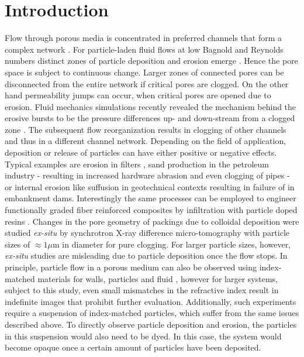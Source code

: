 \documentclass[smallextended]{svjour3}       %
\begin{document}
\section{Introduction}\label{intro}
Flow through porous media is concentrated in preferred channels that form a complex network \cite{Morais-etal-2009,Ebrahimi-etal-2014}. For particle-laden fluid flows at low Bagnold and Reynolds numbers distinct zones of particle deposition and erosion emerge \cite{herrmann-andrade_araujo-2007,araujo-andrade-2006,herrmann-andrade_etal-2006}. Hence the pore space is subject to continuous change. Larger zones of connected pores can be disconnected from the entire network if critical pores are clogged. On the other hand permeability jumps can occur, when critical pores are opened due to erosion. Fluid mechanics simulations recently revealed the mechanism behind the erosive bursts to be the pressure differences up- and down-stream from a clogged zone \cite{Jaeger-etal_2017}. The subsequent flow reorganization results in clogging of other channels and thus in a different channel network. Depending on the field of application, deposition or release of particles can have either positive or negative effects. Typical examples are erosion in filters \cite{Alem-etal-2015}, sand production in the petroleum industry - resulting in increased hardware abrasion and even clogging of pipes \cite{Acock2004,Dehghani2010} - or internal erosion like suffusion in geotechnical contexts \cite{Richards2007,Fannin2014,sherard-dunnigan-1989,frishfelds-etal-2011} resulting in failure of in embankment dams. Interestingly the same processes can be employed to engineer functionally graded fiber reinforced composites by infiltration with particle doped resins \cite{lundstroem-frishfelds-2012}. Changes in the pore geometry of packings due to colloidal deposition were studied \textit{ex-situ} by synchrotron X-ray difference micro-tomography \cite{Chen-etal-2008,Chen-etal-2009} with particle sizes of $\approx 1\mu$m in diameter for pure clogging. For larger particle sizes, however, \textit{ex-situ} studies are misleading due to particle deposition once the flow stops. In principle, particle flow in a porous medium can also be observed using index-matched materials for walls, particles and fluid \cite{Dijksman-etal-2012}, however for larger systems, subject to this study, even small mismatches in the refractive index result in indefinite images that prohibit further evaluation. Additionally, such experiments require a suspension of index-matched particles, which suffer from the same issues described above. To directly observe particle deposition and erosion, the particles in this suspension would also need to be dyed. In this case, the system would become opaque once a certain amount of particles have been deposited.
\end{document}
